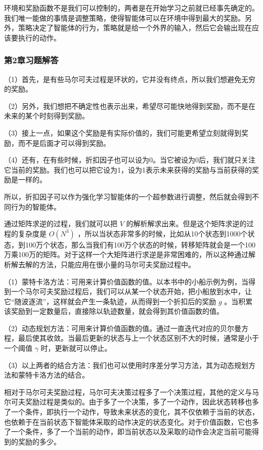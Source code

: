 环境和奖励函数不是我们可以控制的，两者是在开始学习之前就已经事先确定的。我们唯一能做的事情是调整策略，使得智能体可以在环境中得到最大的奖励。另外，策略决定了智能体的行为，策略就是给一个外界的输入，然后它会输出现在应该要执行的动作。



\subsubsection*{第2章习题解答}


（1）首先，是有些马尔可夫过程是环状的，它并没有终点，所以我们想避免无穷的奖励。

（2）另外，我们想把不确定性也表示出来，希望尽可能快地得到奖励，而不是在未来的某个时刻得到奖励。

（3）接上一点，如果这个奖励是有实际价值的，我们可能更希望立刻就得到奖励，而不是后面才可以得到奖励。

（4）还有，在有些时候，折扣因子也可以设为0。当它被设为0后，我们就只关注它当前的奖励。我们也可以把它设为1，设为1表示未来获得的奖励与当前获得的奖励是一样的。

所以，折扣因子可以作为强化学习智能体的一个超参数进行调整，然后就会得到不同行为的智能体。

  
通过矩阵求逆的过程，我们就可以把 $V$ 的解析解求出来。但是这个矩阵求逆的过程的复杂度是 $O(N^3)$ ，所以当状态非常多的时候，比如从10个状态到1000个状态，到100万个状态，那么当我们有100万个状态的时候，转移矩阵就会是一个100万乘100万的矩阵。对于这样一个大矩阵进行求逆是非常困难的，所以这种通过解析解去解的方法，只能应用在很小量的马尔可夫奖励过程中。


（1）蒙特卡洛方法：可用来计算价值函数的值。以本书中的小船示例为例，当得到一个马尔可夫奖励过程后，我们可以从某一个状态开始，把小船放到水中，让它“随波逐流”，这样就会产生一条轨迹，从而得到一个折扣后的奖励 $g$ 。当积累该奖励到一定数量后，直接除以轨迹数量，就会得到其价值函数的值。
  
（2）动态规划方法：可用来计算价值函数的值。通过一直迭代对应的贝尔曼方程，最后使其收敛。当最后更新的状态与上一个状态区别不大的时候，通常是小于一个阈值 $\gamma$ 时，更新就可以停止。
  
（3）以上两者的结合方法：我们也可以使用时序差分学习方法，其为动态规划方法和蒙特卡洛方法的结合。

  
相对于马尔可夫奖励过程，马尔可夫决策过程多了一个决策过程，其他的定义与马尔可夫奖励过程是类似的。由于多了一个决策，多了一个动作，因此状态转移也多了一个条件，即执行一个动作，导致未来状态的变化，其不仅依赖于当前的状态，也依赖于在当前状态下智能体采取的动作决定的状态变化。对于价值函数，它也多了一个条件，多了一个当前的动作，即当前状态以及采取的动作会决定当前可能得到的奖励的多少。

